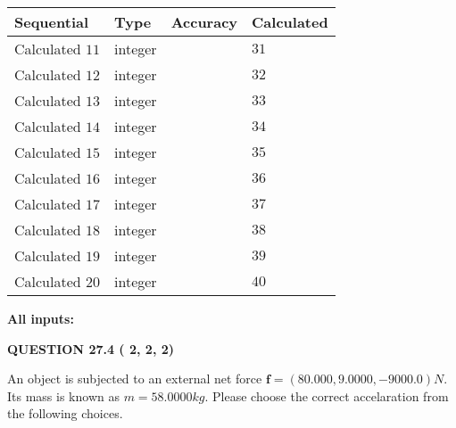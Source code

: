 \documentclass[12pt]{article}
\begin{document}
  
\noindent\begin{tabular}{|l|l|l|l|}
\hline
 Sequential & Type & Accuracy & Calculated \\ 
\hline
 
 
  Calculated $          11$ & integer &  & 
  $ 31 $ 
 \\  \hline  
 
 
  Calculated $          12$ & integer &  & 
  $ 32 $ 
 \\  \hline  
 
 
  Calculated $          13$ & integer &  & 
  $ 33 $ 
 \\  \hline  
 
 
  Calculated $          14$ & integer &  & 
  $ 34 $ 
 \\  \hline  
 
 
  Calculated $          15$ & integer &  & 
  $ 35 $ 
 \\  \hline  
 
 
  Calculated $          16$ & integer &  & 
  $ 36 $ 
 \\  \hline  
 
 
  Calculated $          17$ & integer &  & 
  $ 37 $ 
 \\  \hline  
 
 
  Calculated $          18$ & integer &  & 
  $ 38 $ 
 \\  \hline  
 
 
  Calculated $          19$ & integer &  & 
  $ 39 $ 
 \\  \hline  
 
 
  Calculated $          20$ & integer &  & 
  $ 40 $ 
 \\  \hline  
 \end{tabular}
   
   
   
   
\noindent\vspace{0.1in}\hspace{-0.08in} {\textbf{\Large{All inputs: }}}
   
   
  
\vspace{0.2in}
  
{\textbf{\Large{QUESTION
27.4 
 (          2,          2,          2)
}}}
  
  
 
An object is subjected to an external net force $\mathbf{f}=(
80.000 ,
9.0000,
-9000.0  )N$. Its mass is known as
$m= %
58.0000  kg$. Please choose the correct accelaration
from the following choices.
 
 
 
\end{document}

